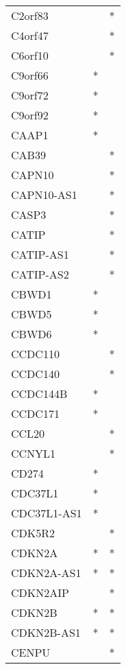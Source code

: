 \begin{longtable}{lcc}
C2orf83        &           &       * \\
C4orf47        &           &       * \\
C6orf10        &           &       * \\
C9orf66        &         * &         \\
C9orf72        &         * &         \\
C9orf92        &         * &         \\
CAAP1          &         * &         \\
CAB39          &           &       * \\
CAPN10         &           &       * \\
CAPN10-AS1     &           &       * \\
CASP3          &           &       * \\
CATIP          &           &       * \\
CATIP-AS1      &           &       * \\
CATIP-AS2      &           &       * \\
CBWD1          &         * &         \\
CBWD5          &         * &         \\
CBWD6          &         * &         \\
CCDC110        &           &       * \\
CCDC140        &           &       * \\
CCDC144B       &         * &         \\
CCDC171        &         * &         \\
CCL20          &           &       * \\
CCNYL1         &           &       * \\
CD274          &         * &         \\
CDC37L1        &         * &         \\
CDC37L1-AS1    &         * &         \\
CDK5R2         &           &       * \\
CDKN2A         &         * &       * \\
CDKN2A-AS1     &         * &       * \\
CDKN2AIP       &           &       * \\
CDKN2B         &         * &       * \\
CDKN2B-AS1     &         * &       * \\
CENPU          &           &       * \\

\end{longtable}
